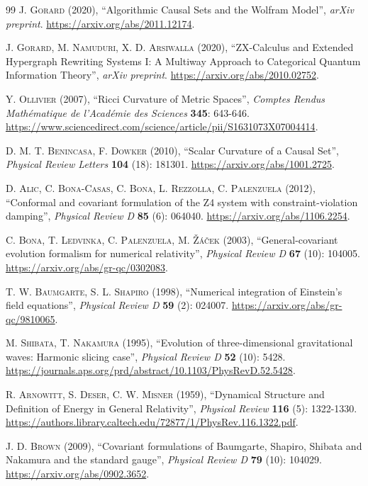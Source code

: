 \documentclass{article}
\begin{document}
\begin{thebibliography}{99}
\textsc{J. Gorard} (2020), ``Algorithmic Causal Sets and the Wolfram Model'', \textit{arXiv preprint}. \url{https://arxiv.org/abs/2011.12174}.

\textsc{J. Gorard, M. Namuduri, X. D. Arsiwalla} (2020), ``ZX-Calculus and Extended Hypergraph Rewriting Systems I: A Multiway Approach to Categorical Quantum Information Theory'', \textit{arXiv preprint}. \url{https://arxiv.org/abs/2010.02752}.

\textsc{Y. Ollivier} (2007), ``Ricci Curvature of Metric Spaces'', \textit{Comptes Rendus Math\'ematique de l'Acad\'emie des Sciences} \textbf{345}: 643-646. \url{https://www.sciencedirect.com/science/article/pii/S1631073X07004414}.

\textsc{D. M. T. Benincasa, F. Dowker} (2010), ``Scalar Curvature of a Causal Set'', \textit{Physical Review Letters} \textbf{104} (18): 181301. \url{https://arxiv.org/abs/1001.2725}.

\textsc{D. Alic, C. Bona-Casas, C. Bona, L. Rezzolla, C. Palenzuela} (2012), ``Conformal and covariant formulation of the Z4 system with constraint-violation damping'', \textit{Physical Review D} \textbf{85} (6): 064040. \url{https://arxiv.org/abs/1106.2254}.

\textsc{C. Bona, T. Ledvinka, C. Palenzuela, M. \v{Z}\'a\v{c}ek} (2003), ``General-covariant evolution formalism for numerical relativity'', \textit{Physical Review D} \textbf{67} (10): 104005. \url{https://arxiv.org/abs/gr-qc/0302083}.

\textsc{T. W. Baumgarte, S. L. Shapiro} (1998), ``Numerical integration of Einstein's field equations'', \textit{Physical Review D} \textbf{59} (2): 024007. \url{https://arxiv.org/abs/gr-qc/9810065}.

\textsc{M. Shibata, T. Nakamura} (1995), ``Evolution of three-dimensional gravitational waves: Harmonic slicing case'', \textit{Physical Review D} \textbf{52} (10): 5428. \url{https://journals.aps.org/prd/abstract/10.1103/PhysRevD.52.5428}.

\textsc{R. Arnowitt, S. Deser, C. W. Misner} (1959), ``Dynamical Structure and Definition of Energy in General Relativity'', \textit{Physical Review} \textbf{116} (5): 1322-1330. \url{https://authors.library.caltech.edu/72877/1/PhysRev.116.1322.pdf}.

\textsc{J. D. Brown} (2009), ``Covariant formulations of Baumgarte, Shapiro, Shibata and Nakamura and the standard gauge'', \textit{Physical Review D} \textbf{79} (10): 104029. \url{https://arxiv.org/abs/0902.3652}.


\end{thebibliography}
\end{document}
